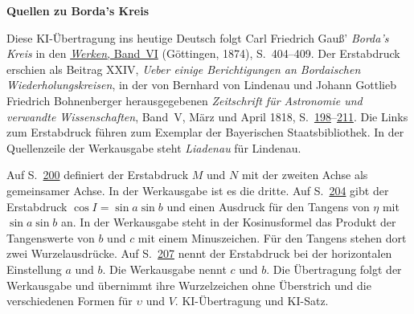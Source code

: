 \clearpage\thispagestyle{empty}
\begin{center}\textbf{Quellen zu Borda’s Kreis}\end{center}
\noindent Diese KI-Übertragung ins heutige Deutsch folgt Carl Friedrich Gauß’ \textit{Borda’s Kreis} in den \href{https://gdz.sub.uni-goettingen.de/id/PPN236007467}{\textit{Werken}, Band~VI} (Göttingen, 1874), S.~404--409. Der Erstabdruck erschien als Beitrag XXIV, \textit{Ueber einige Berichtigungen an Bordaischen Wiederholungskreisen}, in der von Bernhard von Lindenau und Johann Gottlieb Friedrich Bohnenberger herausgegebenen \textit{Zeitschrift für Astronomie und verwandte Wissenschaften}, Band~V, März und April 1818, S.~\href{https://api.digitale-sammlungen.de/iiif/image/v2/bsb10061007_00208/full/1600,/0/default.jpg}{198}--\href{https://api.digitale-sammlungen.de/iiif/image/v2/bsb10061007_00221/full/1600,/0/default.jpg}{211}. Die Links zum Erstabdruck führen zum Exemplar der Bayerischen Staatsbibliothek. In der Quellenzeile der Werkausgabe steht \textit{Liadenau} für Lindenau.
\par\smallskip\noindent Auf S.~\href{https://api.digitale-sammlungen.de/iiif/image/v2/bsb10061007_00210/full/1600,/0/default.jpg}{200} definiert der Erstabdruck $M$ und $N$ mit der zweiten Achse als gemeinsamer Achse. In der Werkausgabe ist es die dritte. Auf S.~\href{https://api.digitale-sammlungen.de/iiif/image/v2/bsb10061007_00214/full/1600,/0/default.jpg}{204} gibt der Erstabdruck $\cos I=\sin a\sin b$ und einen Ausdruck für den Tangens von $\eta$ mit $\sin a\sin b$ an. In der Werkausgabe steht in der Kosinusformel das Produkt der Tangenswerte von $b$ und $c$ mit einem Minuszeichen. Für den Tangens stehen dort zwei Wurzelausdrücke. Auf S.~\href{https://api.digitale-sammlungen.de/iiif/image/v2/bsb10061007_00217/full/1600,/0/default.jpg}{207} nennt der Erstabdruck bei der horizontalen Einstellung $a$ und $b$. Die Werkausgabe nennt $c$ und $b$. Die Übertragung folgt der Werkausgabe und übernimmt ihre Wurzelzeichen ohne Überstrich und die verschiedenen Formen für $\upsilon$ und $V$. KI-Übertragung und KI-Satz.
\clearpage
